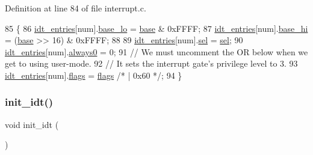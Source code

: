 Definition at line 84 of file interrupt.\+c.


\begin{DoxyCode}
85 \{
86     \hyperlink{a00089_a02c62ffc54da283f5faaa40b125d2dce_a02c62ffc54da283f5faaa40b125d2dce}{idt\_entries}[num].\hyperlink{a00194_a4b5fce0881deb4959d33da77d1ed0202_a4b5fce0881deb4959d33da77d1ed0202}{base\_lo} = \hyperlink{a00083_a0523cedff47e2441fc198b7770ec5d3f_a0523cedff47e2441fc198b7770ec5d3f}{base} & 0xFFFF;
87     \hyperlink{a00089_a02c62ffc54da283f5faaa40b125d2dce_a02c62ffc54da283f5faaa40b125d2dce}{idt\_entries}[num].\hyperlink{a00194_af46adb2603d1d8b4a3bedf7f1c6daed4_af46adb2603d1d8b4a3bedf7f1c6daed4}{base\_hi} = (\hyperlink{a00083_a0523cedff47e2441fc198b7770ec5d3f_a0523cedff47e2441fc198b7770ec5d3f}{base} >> 16) & 0xFFFF;
88 
89     \hyperlink{a00089_a02c62ffc54da283f5faaa40b125d2dce_a02c62ffc54da283f5faaa40b125d2dce}{idt\_entries}[num].\hyperlink{a00194_a3c9321c263139e56901a05efee220047_a3c9321c263139e56901a05efee220047}{sel}     = \hyperlink{a00089_af0b0a7e10694e3b600c7561311cc8271_af0b0a7e10694e3b600c7561311cc8271}{sel};
90     \hyperlink{a00089_a02c62ffc54da283f5faaa40b125d2dce_a02c62ffc54da283f5faaa40b125d2dce}{idt\_entries}[num].\hyperlink{a00194_adc747b3ff87142c71b7b8c51e03c067c_adc747b3ff87142c71b7b8c51e03c067c}{always0} = 0;
91     \textcolor{comment}{// We must uncomment the OR below when we get to using user-mode.}
92     \textcolor{comment}{// It sets the interrupt gate's privilege level to 3.}
93     \hyperlink{a00089_a02c62ffc54da283f5faaa40b125d2dce_a02c62ffc54da283f5faaa40b125d2dce}{idt\_entries}[num].\hyperlink{a00194_a02277c77564820972ae5df0a37c80be0_a02277c77564820972ae5df0a37c80be0}{flags}   = \hyperlink{a00089_aa2585d779da0ab21273a8d92de9a0ebe_aa2585d779da0ab21273a8d92de9a0ebe}{flags} \textcolor{comment}{/* | 0x60 */};
94 \}
\end{DoxyCode}
\mbox{\label{a00089_a35fe413107af682030ab7a4b6dff19b8_a35fe413107af682030ab7a4b6dff19b8}} 
\subsubsection{\texorpdfstring{init\+\_\+idt()}{init\_idt()}}
{\footnotesize\ttfamily void init\+\_\+idt (\begin{DoxyParamCaption}{ }\end{DoxyParamCaption})}



